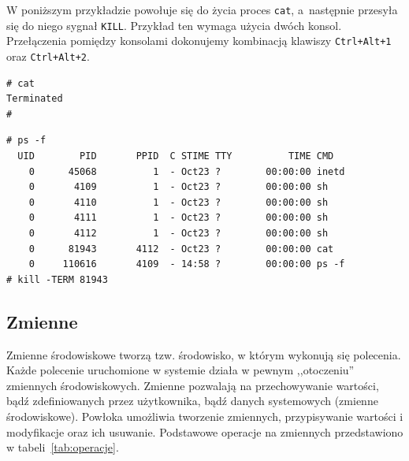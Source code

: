 \begin{example}
W poniższym przykładzie powołuje się do życia proces \lstinline[style=MyBashStyle]{cat}, a~następnie przesyła się do niego sygnał \lstinline[style=MyBashStyle]{KILL}. Przykład ten wymaga użycia dwóch konsol. Przełączenia pomiędzy konsolami dokonujemy kombinacją klawiszy \lstinline[style=MyBashStyle]{Ctrl+Alt+1} oraz \lstinline[style=MyBashStyle]{Ctrl+Alt+2}.

\begin{lstlisting}[style=MyBashStyle,caption=Konsola 1]
# cat
Terminated
#
\end{lstlisting}

\begin{lstlisting}[style=MyBashStyle,caption=Konsola 2,deletekeywords={cat,ps}]
# ps -f
  UID        PID       PPID  C STIME TTY          TIME CMD
    0      45068          1  - Oct23 ?        00:00:00 inetd
    0       4109          1  - Oct23 ?        00:00:00 sh
    0       4110          1  - Oct23 ?        00:00:00 sh
    0       4111          1  - Oct23 ?        00:00:00 sh
    0       4112          1  - Oct23 ?        00:00:00 sh
    0      81943       4112  - Oct23 ?        00:00:00 cat
    0     110616       4109  - 14:58 ?        00:00:00 ps -f
# kill -TERM 81943
\end{lstlisting}

\end{example}



\subsection{Zmienne}

Zmienne środowiskowe tworzą tzw. środowisko, w którym wykonują się polecenia. Każde polecenie uruchomione w systemie działa w pewnym ,,otoczeniu'' zmiennych środowiskowych. Zmienne pozwalają na przechowywanie wartości, bądź zdefiniowanych przez użytkownika, bądź danych systemowych (zmienne środowiskowe). Powłoka umożliwia tworzenie zmiennych, przypisywanie wartości i modyfikacje oraz ich usuwanie. Podstawowe operacje na zmiennych przedstawiono w tabeli~\ref{tab:operacje}.

